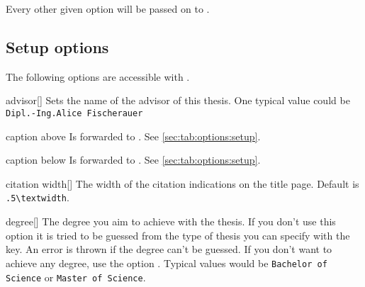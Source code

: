 \noindent
Every other given option will be passed on to .
\subsection{Setup options}\label{sec:thesis:setup}%
The following options are accessible with .
\begin{describeopt}{advisor}[]
  Sets the name of the advisor of this thesis. One typical value could be
  \texttt{Dipl.-Ing.\@ Alice Fischerauer}
\end{describeopt}
\begin{describeopt}{caption above}
  Is forwarded to . See \autoref{sec:tab:options:setup}.
\end{describeopt}
\begin{describeopt}{caption below}
  Is forwarded to . See \autoref{sec:tab:options:setup}.
\end{describeopt}
\begin{describeopt}{citation width}[]
  The width of the citation indications on the title page. Default is
  \verb|.5\textwidth|.
\end{describeopt}
\begin{describeopt}{degree}[]
  The degree you aim to achieve with the thesis. If you don't use this option it
  is tried to be guessed from the type of thesis you can specify with the
   key. An error is thrown if the degree can't be guessed. If you
  don't want to achieve any degree, use the option . Typical
  values would be \verb|Bachelor of Science| or \verb|Master of Science|.
\end{describeopt}
